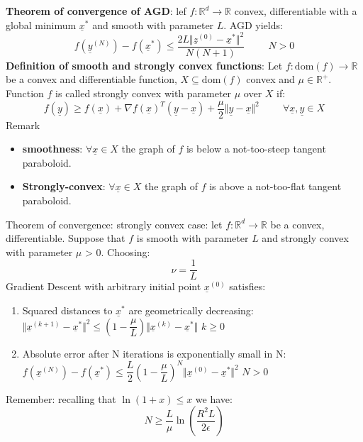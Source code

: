 \textbf{Theorem of convergence of AGD}: lef $f: \mathbb{R}^d \to \mathbb{R}$ convex, differentiable with a global minimum $\underline{x}^*$ and smooth with parameter $L$. AGD yields:
\[
f(\underline{y}^{(N)}) - f(\underline{x}^*) \leq \dfrac{2L \Vert \underline{z}^{(0)} - \underline{x}^* \Vert^2}{N(N+1)}  \hspace{1cm} N > 0   
\]
\textbf{Definition of smooth and strongly convex functions}: Let $f: \text{dom}(f) \to \mathbb{R}$ be a convex and differentiable function, $X \subseteq \text{dom}(f)$ convex and $\mu \in \mathbb{R}^+$. Function $f$ is called strongly convex with parameter $\mu$ over $X$ if:
\[
f(\underline{y}) \geq f(\underline{x}) + \nabla f(\underline{x})^T (\underline{y} - \underline{x}) + \dfrac{\mu}{2} \Vert \underline{y} - \underline{x} \Vert^2 \hspace{1cm} \forall \underline{x}, \underline{y} \in X    
\] 
Remark
\begin{itemize}
    \item \textbf{smoothness}: $\forall \underline{x} \in X$ the graph of $f$ is below a not-too-steep tangent paraboloid.
    \item \textbf{Strongly-convex}: $\forall \underline{x} \in X$ the graph of $f$ is above a not-too-flat tangent paraboloid.\\ 
\end{itemize}

Theorem of convergence: strongly convex case: let $f: \mathbb{R}^d \to \mathbb{R}$ be a convex, differentiable. Suppose that $f$ is smooth with parameter $L$ and strongly convex with parameter $\mu$ > 0. Choosing:
\[
    \nu = \dfrac{1}{L}    
\]
Gradient Descent with arbitrary initial point $\underline{x}^{(0)}$ satisfies:
\begin{enumerate}
    \item Squared distances to $\underline{x}^*$ are geometrically decreasing: $\Vert \underline{x}^{(k+1)} - \underline{x}^* \Vert^2 \leq \left(1-\dfrac{\mu}{L}\right)\Vert \underline{x}^{(k)} - \underline{x}^* \Vert$ \hspace{1cm} $k \geq 0$
    \item Absolute error after N iterations is exponentially small in N: $f(\underline{x}^{(N)}) - f(\underline{x}^*) \leq \dfrac{L}{2}\left(1-\dfrac{\mu}{L}\right)^N \Vert \underline{x}^{(0)} - \underline{x}^* \Vert^2$ \hspace{1cm} $N > 0$
\end{enumerate}
Remember: recalling that $\ln(1+x)\leq x$ we have:
\[
    N \geq \dfrac{L}{\mu} \ln\left(\dfrac{R^2 L}{2\epsilon}\right)    
\]

